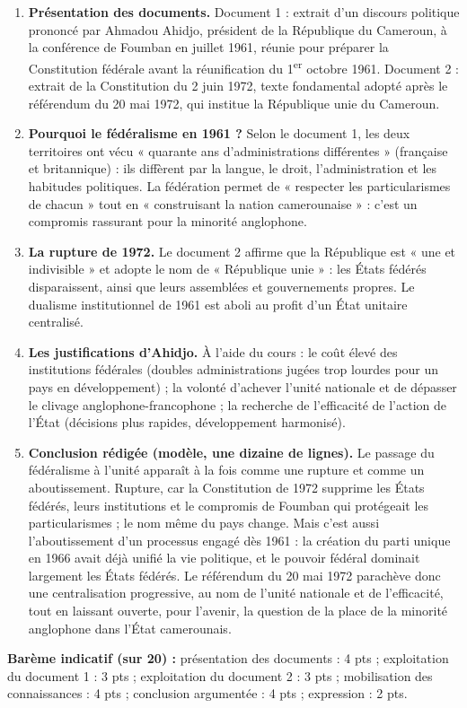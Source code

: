 \documentclass[11pt]{article}
\begin{document}
\begin{corrige}
\begin{enumerate}
\item \textbf{Présentation des documents.} Document 1 : extrait d'un discours politique prononcé par Ahmadou Ahidjo, président de la République du Cameroun, à la conférence de Foumban en juillet 1961, réunie pour préparer la Constitution fédérale avant la réunification du 1\textsuperscript{er} octobre 1961. Document 2 : extrait de la Constitution du 2 juin 1972, texte fondamental adopté après le référendum du 20 mai 1972, qui institue la République unie du Cameroun.
\item \textbf{Pourquoi le fédéralisme en 1961 ?} Selon le document 1, les deux territoires ont vécu « quarante ans d'administrations différentes » (française et britannique) : ils diffèrent par la langue, le droit, l'administration et les habitudes politiques. La fédération permet de « respecter les particularismes de chacun » tout en « construisant la nation camerounaise » : c'est un compromis rassurant pour la minorité anglophone.
\item \textbf{La rupture de 1972.} Le document 2 affirme que la République est « une et indivisible » et adopte le nom de « République unie » : les États fédérés disparaissent, ainsi que leurs assemblées et gouvernements propres. Le dualisme institutionnel de 1961 est aboli au profit d'un État unitaire centralisé.
\item \textbf{Les justifications d'Ahidjo.} À l'aide du cours : le coût élevé des institutions fédérales (doubles administrations jugées trop lourdes pour un pays en développement) ; la volonté d'achever l'unité nationale et de dépasser le clivage anglophone-francophone ; la recherche de l'efficacité de l'action de l'État (décisions plus rapides, développement harmonisé).
\item \textbf{Conclusion rédigée (modèle, une dizaine de lignes).} Le passage du fédéralisme à l'unité apparaît à la fois comme une rupture et comme un aboutissement. Rupture, car la Constitution de 1972 supprime les États fédérés, leurs institutions et le compromis de Foumban qui protégeait les particularismes ; le nom même du pays change. Mais c'est aussi l'aboutissement d'un processus engagé dès 1961 : la création du parti unique en 1966 avait déjà unifié la vie politique, et le pouvoir fédéral dominait largement les États fédérés. Le référendum du 20 mai 1972 parachève donc une centralisation progressive, au nom de l'unité nationale et de l'efficacité, tout en laissant ouverte, pour l'avenir, la question de la place de la minorité anglophone dans l'État camerounais.
\end{enumerate}
\textbf{Barème indicatif (sur 20) :} présentation des documents : 4 pts ; exploitation du document 1 : 3 pts ; exploitation du document 2 : 3 pts ; mobilisation des connaissances : 4 pts ; conclusion argumentée : 4 pts ; expression : 2 pts.


\end{corrige}
\end{document}
